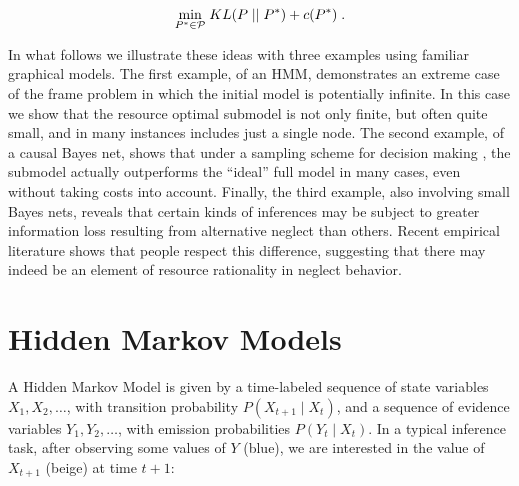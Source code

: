 \documentclass[10pt,letterpaper]{article}
\begin{document}
\begin{equation} \underset{P^*\in\mathcal{P}}{\textnormal{min}} \; KL(P\;||\;P^*) + c(P^*)\;.\label{optimal}\end{equation}


In what follows we illustrate these ideas with three examples using familiar graphical models. The first example, of an HMM, demonstrates an extreme case of the frame problem in which the initial model is potentially infinite. In this case we show that the resource optimal submodel is not only finite, but often quite small, and in many instances includes just a single node. The second example, of a causal Bayes net, shows that under a sampling scheme for decision making \citep{Vul2014}, the submodel actually outperforms the ``ideal'' full model in many cases, even without taking costs into account. Finally, the third example, also involving small Bayes nets, reveals that certain kinds of inferences may be subject to greater information loss resulting from alternative neglect than others. Recent empirical literature shows that people respect this difference, suggesting that there may indeed be an element of resource rationality in neglect behavior.

\section{Hidden Markov Models}

A Hidden Markov Model is given by a time-labeled sequence of state variables $X_1,X_2,\dots$, with transition probability $P(X_{t+1}\mid X_t)$, and a sequence of evidence variables $Y_1,Y_2,\dots$, with emission probabilities $P(Y_t\mid X_t)$. In a typical inference task, after observing some values of $Y$ (blue), we are interested in the value of $X_{t+1}$ (beige) at time $t+1$:
\end{document}
